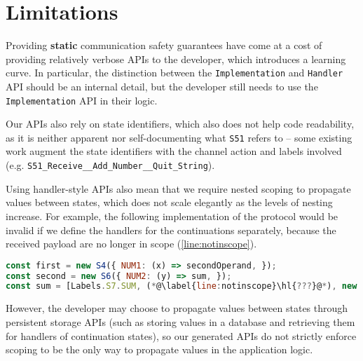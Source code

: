 \section{Limitations}
\label{section:nodelimitations}

Providing \textbf{static} communication safety guarantees have
come at a cost of providing relatively verbose APIs to the developer,
which introduces a learning curve. In particular,
the distinction between the \texttt{Implementation} and
\texttt{Handler} API should be an internal detail, but
the developer still needs to use the \texttt{Implementation} API
in their logic. 

Our APIs also rely on state identifiers, which also
does not help code readability, as it is neither apparent nor
self-documenting what \texttt{S51} refers to -- some existing work
\cite{Hybrid2016} augment the state identifiers with the channel
action and labels involved (e.g. 
\texttt{S51_Receive__Add_Number__Quit_String}).

Using handler-style APIs also mean that we require
nested scoping to propagate values between states,
which does not scale elegantly as the levels of nesting
increase. For example, the following implementation of
the  protocol would be invalid if
we define the handlers for the continuations separately,
because the received payload are no longer in scope
(\cref{line:notinscope}).

\begin{lstlisting}[language=javascript]
const first = new S4({ NUM1: (x) => secondOperand, });
const second = new S6({ NUM2: (y) => sum, });
const sum = [Labels.S7.SUM, (*@\label{line:notinscope}\hl{???}@*), new S5()];
\end{lstlisting}

However, the developer may choose to propagate values
between states through persistent storage APIs (such as
storing values in a database and retrieving them for
handlers of continuation states), so our generated APIs
do not strictly enforce scoping to be the only way to
propagate values in the application logic.